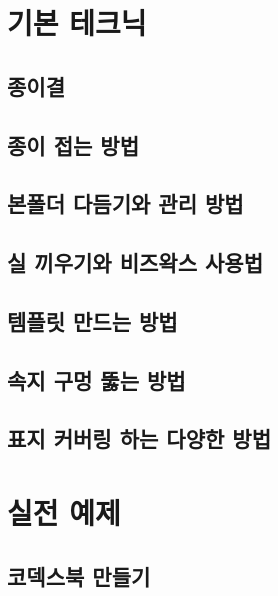 \documentclass[12pt, a4paper, oneside]{book}
\begin{document}
	\newpage
	\chapter{기본 테크닉}





	\section{종이결}

	\section{종이 접는 방법}

	\section{본폴더 다듬기와 관리 방법}

	\section{실 끼우기와 비즈왁스 사용법}

	\section{템플릿 만드는 방법}


	\section{속지 구멍 뚫는 방법}

	\section{표지 커버링 하는 다양한 방법}


	\newpage
	\chapter{실전 예제}



	\section{코덱스북 만들기}
\end{document}
